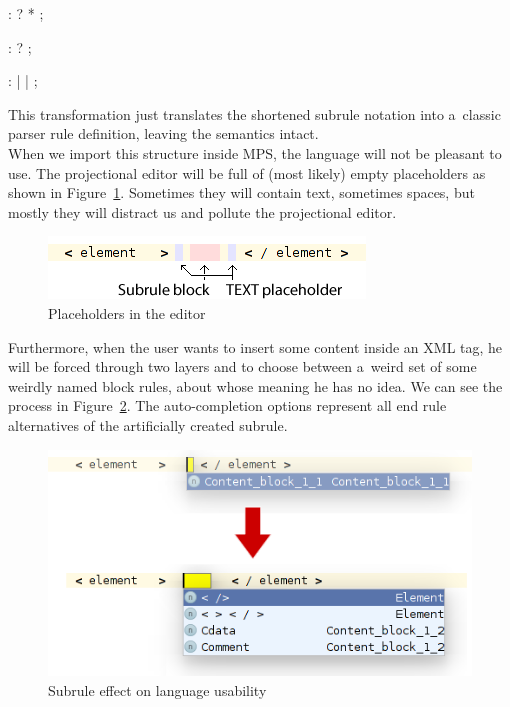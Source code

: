 \begin{antlr}
	          :   ? * ;

	 :    ?
	                 ;

	 :   
	                 |   
	                 |   
	                 ;
\end{antlr}

This transformation just translates the shortened subrule notation into a~classic parser rule definition, leaving the semantics intact.
\\

When we import this structure inside MPS, the language will not be pleasant to use.
The projectional editor will be full of (most likely) empty  placeholders as shown in Figure~\ref{fig:text_placeholders}.
Sometimes they will contain text, sometimes spaces, but mostly they will distract us and pollute the projectional editor.

\begin{figure}[ht]
	\centering
	\includegraphics[scale=0.75]{./img/text_placeholders.png}
	\caption{Placeholders in the editor}
	\label{fig:text_placeholders}
\end{figure}

Furthermore, when the user wants to insert some content inside an XML tag, he will be forced through two layers and to choose between a~weird set of some weirdly named block rules, about whose meaning he has no idea.
We can see the process in Figure~\ref{fig:subrule_problem}.
The auto-completion options represent all end rule alternatives of the artificially created  subrule.
\\

\begin{figure}[ht]
	\centering
	\includegraphics[scale=0.75]{./img/subrule_problem.png}
	\caption{Subrule effect on language usability}
	\label{fig:subrule_problem}
\end{figure}

